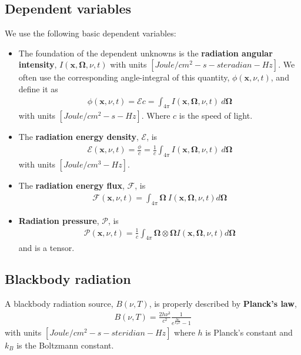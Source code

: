 \documentclass[10pt,letterpaper,notitlepage]{article}
\numberwithin{equation}{section}
\newcommand{\Omegabf}{\mathbf{\Omega}}
\newcommand{\position}{\mathbf{x}}
\newcommand{\RadE}{\mathcal{E}}
\newcommand{\RadF}{\boldsymbol{\mathcal{F}}}
\newcommand{\RadP}{\boldsymbol{\mathcal{P}}}
\newcommand{\beqn}{\begin{equation}\begin{aligned}}
\newcommand{\eeqn}{\end{aligned}\end{equation}}
\newcommand{\Edensity}{\mathcal{E}}
\begin{document}
\vspace{0.5cm}
\subsection{Dependent variables}
We use the following basic dependent variables:
\begin{itemize}
\item The foundation of the dependent unknowns is the \textbf{radiation angular intensity}, $I(\position, \Omegabf, \nu,t)$ with units $[Joule/cm^2 {-} s {-} steradian {-} Hz]$. We often use the corresponding angle-integral of this quantity, $\phi(\position,\nu,t)$, and define it as
	\beqn 
	\phi(\position,\nu,t) = \RadE c = \int_{4\pi} I(\position,\Omegabf,\nu,t) \ d\Omegabf
	\eeqn 
	with units $[Joule/cm^2 {-} s {-} Hz]$. Where $c$ is the speed of light.
\item  The \textbf{radiation energy density}, $\Edensity$, is 
	\beqn 
	\Edensity(\position, \nu, t) = \frac{\phi}{c}  = 
	\frac{1}{c} \int_{4\pi} I(\position,\Omegabf,\nu,t) \ d\Omegabf
	\eeqn 
	with units $[Joule/cm^3 {-} Hz]$.
\item The \textbf{radiation energy flux}, $\RadF$, is
	\beqn 
    \RadF(\position, \nu, t) = \int_{4\pi} \Omegabf \  I(\position, \Omegabf, \nu, t) d\Omegabf
	\eeqn 
\item \textbf{Radiation pressure}, $\RadP$, is 
	\beqn
	\RadP(\position, \nu, t) = \frac{1}{c}\int_{4\pi} \Omegabf \otimes \Omegabf I(\position, \Omegabf, \nu, t) d\Omegabf
	\eeqn 
	and is a tensor.
\end{itemize}


\vspace{0.5cm}
\subsection{Blackbody radiation}
A blackbody radiation source, $B(\nu,T)$, is properly described by \textbf{Planck's law},
\beqn \label{eq:plancks_law}
B(\nu,T) = \frac{2h\nu^3}{c^2} \frac{1}{e^{\frac{h\nu}{k_B T}} - 1  }
\eeqn 
with units $[Joule/cm^2 {-} s {-} steridian-Hz]$ where $h$ is Planck's constant and $k_B$ is the Boltzmann constant.
\end{document}
